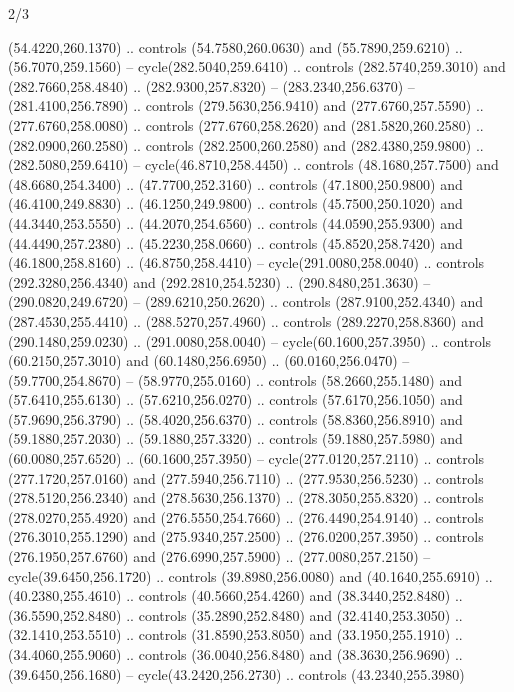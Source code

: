 \begin{flagdescription}{2/3}
\begin{scope}[xshift=0.5\flaglength,yshift=0.5\flagwidth,scale=\stretchfactor]
\begin{scope}[scale=0.001645\flagwidth,yshift=65mm,xshift=-63mm]
\begin{scope}[y=0.80pt, x=0.80pt, yscale=-1,]
\begin{scope}[cm={{1.33333,0.0,0.0,1.33333,(0.0,1e-05)}}]
  (54.4220,260.1370) .. controls (54.7580,260.0630) and (55.7890,259.6210) ..
  (56.7070,259.1560) -- cycle(282.5040,259.6410) .. controls (282.5740,259.3010)
  and (282.7660,258.4840) .. (282.9300,257.8320) -- (283.2340,256.6370) --
  (281.4100,256.7890) .. controls (279.5630,256.9410) and (277.6760,257.5590) ..
  (277.6760,258.0080) .. controls (277.6760,258.2620) and (281.5820,260.2580) ..
  (282.0900,260.2580) .. controls (282.2500,260.2580) and (282.4380,259.9800) ..
  (282.5080,259.6410) -- cycle(46.8710,258.4450) .. controls (48.1680,257.7500)
  and (48.6680,254.3400) .. (47.7700,252.3160) .. controls (47.1800,250.9800)
  and (46.4100,249.8830) .. (46.1250,249.9800) .. controls (45.7500,250.1020)
  and (44.3440,253.5550) .. (44.2070,254.6560) .. controls (44.0590,255.9300)
  and (44.4490,257.2380) .. (45.2230,258.0660) .. controls (45.8520,258.7420)
  and (46.1800,258.8160) .. (46.8750,258.4410) -- cycle(291.0080,258.0040) ..
  controls (292.3280,256.4340) and (292.2810,254.5230) .. (290.8480,251.3630) --
  (290.0820,249.6720) -- (289.6210,250.2620) .. controls (287.9100,252.4340) and
  (287.4530,255.4410) .. (288.5270,257.4960) .. controls (289.2270,258.8360) and
  (290.1480,259.0230) .. (291.0080,258.0040) -- cycle(60.1600,257.3950) ..
  controls (60.2150,257.3010) and (60.1480,256.6950) .. (60.0160,256.0470) --
  (59.7700,254.8670) -- (58.9770,255.0160) .. controls (58.2660,255.1480) and
  (57.6410,255.6130) .. (57.6210,256.0270) .. controls (57.6170,256.1050) and
  (57.9690,256.3790) .. (58.4020,256.6370) .. controls (58.8360,256.8910) and
  (59.1880,257.2030) .. (59.1880,257.3320) .. controls (59.1880,257.5980) and
  (60.0080,257.6520) .. (60.1600,257.3950) -- cycle(277.0120,257.2110) ..
  controls (277.1720,257.0160) and (277.5940,256.7110) .. (277.9530,256.5230) ..
  controls (278.5120,256.2340) and (278.5630,256.1370) .. (278.3050,255.8320) ..
  controls (278.0270,255.4920) and (276.5550,254.7660) .. (276.4490,254.9140) ..
  controls (276.3010,255.1290) and (275.9340,257.2500) .. (276.0200,257.3950) ..
  controls (276.1950,257.6760) and (276.6990,257.5900) .. (277.0080,257.2150) --
  cycle(39.6450,256.1720) .. controls (39.8980,256.0080) and (40.1640,255.6910)
  .. (40.2380,255.4610) .. controls (40.5660,254.4260) and (38.3440,252.8480) ..
  (36.5590,252.8480) .. controls (35.2890,252.8480) and (32.4140,253.3050) ..
  (32.1410,253.5510) .. controls (31.8590,253.8050) and (33.1950,255.1910) ..
  (34.4060,255.9060) .. controls (36.0040,256.8480) and (38.3630,256.9690) ..
  (39.6450,256.1680) -- cycle(43.2420,256.2730) .. controls (43.2340,255.3980)

\end{scope}
\end{scope}
\end{scope}
\end{scope}
\end{flagdescription}
